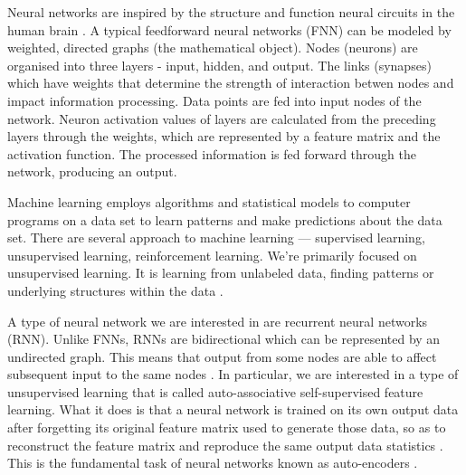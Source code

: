 \documentclass[%
 reprint,
 amsmath,amssymb,
 aps,
]{revtex4-2}
\begin{document}
Neural networks are inspired by the structure and function neural circuits in the human brain \cite{rumelhart1986parallel} \cite{charu2018neural}. A typical feedforward neural networks (FNN) can be modeled by weighted, directed graphs (the mathematical object). Nodes (neurons) are organised into three layers - input, hidden, and output. The links (synapses) which have weights that determine the strength of interaction betwen nodes and impact information processing. Data points are fed into input nodes of the network. Neuron activation values of layers are calculated from the preceding layers through the weights, which are represented by a feature matrix and the activation function. The processed information is fed forward through the network, producing an output\cite{goodfellow2016deep}.

Machine learning employs algorithms and statistical models to computer programs on a data set to learn patterns and make predictions about the data set. There are several approach to machine learning --- supervised learning, unsupervised learning, reinforcement learning. We're primarily focused on unsupervised learning. It is learning from unlabeled data, finding patterns or underlying structures within the data \cite{murphy2012machine}.

A type of neural network we are interested in are recurrent neural networks (RNN). Unlike FNNs, RNNs are bidirectional which can be represented by an undirected graph. This means that output from some nodes are able to affect subsequent input to the same nodes \cite{dupond2019thorough}\cite{tealab2018time}. In particular, we are interested in a type of unsupervised learning that is called auto-associative self-supervised feature learning. What it does is that a neural network is trained on its own output data after forgetting its original feature matrix used to generate those data, so as to reconstruct the feature matrix and reproduce the same output data statistics \cite{kramer1991nonlinear}. This is the fundamental task of neural networks known as auto-encoders \cite{SCHNEIDER2022149}. 
\end{document}

